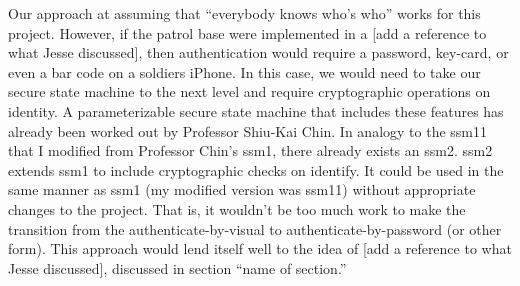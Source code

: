 Our approach at assuming that “everybody knows who’s who” works
for this project. However, if the patrol base were implemented in
a [add a reference to what Jesse discussed], then authentication
would require a password, key-card, or even a bar code on a soldiers
iPhone. In this case, we would need to take our secure state machine
to the next level and require cryptographic operations on identity.
A parameterizable secure state machine that includes these features
has already been worked out by Professor Shiu-Kai Chin. In analogy
to the ssm11 that I modified from Professor Chin’s ssm1, there already
exists an ssm2. ssm2 extends ssm1 to include cryptographic checks on
identify. It could be used in the same manner as ssm1 (my modified
version was ssm11) without appropriate changes to the project. That is,
it wouldn’t be too much work to make the transition from the
authenticate-by-visual to authenticate-by-password (or other form).
This approach would lend itself well to the idea of [add a reference
to what Jesse discussed], discussed in section “name of section.”